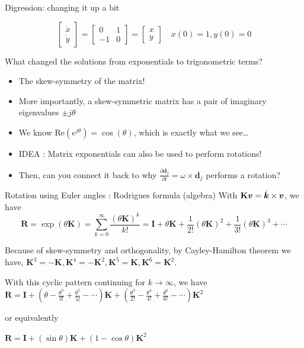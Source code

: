 \documentclass[notes]{beamer}
\newcommand{\gv}[1]{\ensuremath{\mbox{\boldmath$ #1 $}}}
\newcommand{\bv}[1]{\ensuremath{\mathbf{#1}}}
\begin{document}
\begin{frame}[label={sec:org9e47536}]{Digression: changing it up a bit}
\begin{example}
\[ \begin{bmatrix}\dot{x} \\ \dot{y} \end{bmatrix} =
	 \begin{bmatrix} 0 & 1 \\ -1 & 0 \end{bmatrix} =
	 \begin{bmatrix}{x} \\ {y} \end{bmatrix} \quad x(0) = 1, y(0) = 0\]
\end{example}
\begin{block}{What changed the solutions from exponentials to trigonometric terms?}
\begin{itemize}
\item The skew-symmetry of the matrix!
\item More importantly, a skew-symmetric matrix has a pair of imaginary
eigenvalues \(\pm j \theta\)
\item We know \(\mathrm{Re}{(e^{j \theta})} = \cos(\theta)\), which is exactly
what we see\ldots{}
\item \alert{IDEA} : Matrix exponentials can also be used to perform rotations!
\item Then, can you connect it back to why \(\frac{\partial \bv{d}_j}{\partial t} = \omega \times \bv{d}_j\) performs a rotation?
\end{itemize}
\end{block}
\end{frame}
\begin{frame}[label={sec:org61bcbfa}]{Rotation using Euler angles : Rodrigues formula (algebra)}
With \(\mathbf{K}\gv{v} = \hat{\gv{k}} \times \gv{v}\), we have
\[ \bv{R}=\exp(\theta \bv {K} )=\sum _{k=0}^{\infty }{\frac {(\theta \bv
{K} )^{k}}{k!}}= \bv{I} + \theta \bv {K} + {\frac {1}{2!}}(\theta \bv {K}
)^{2} + {\frac {1}{3!}}(\theta \bv {K} )^{3} + \cdots  \]

Because of skew-symmetry and orthogonality, by Cayley-Hamilton theorem we have, \(\mathbf {K} ^{3}=-\mathbf {K}, \mathbf {K}^{4}=-\mathbf{K}^2,\mathbf
  {K}^{5}=\mathbf{K},\mathbf{K}^{6}=\mathbf{K}^2\).

With this cyclic pattern continuing for \(k \to \infty\), we have
\(\bv{R}=\bv{I}+\left(\theta -{\frac {\theta ^{3}}{3!}}+{\frac {\theta
  ^{5}}{5!}}-\cdots \right)\mathbf{K} +\left({\frac {\theta ^{2}}{2!}}-{\frac
  {\theta ^{4}}{4!}} + {\frac {\theta ^{6}}{6!}}-\cdots \right) \mathbf{K} ^{2}\)

or equivalently

\(\mathbf {R} =\mathbf {I} +(\sin \theta )\mathbf {K} +(1-\cos \theta )\mathbf {K} ^{2}\)
\end{frame}
\end{document}
